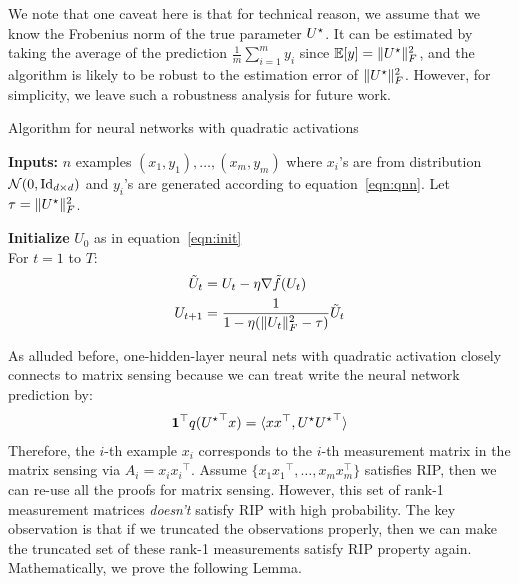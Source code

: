  We note that one caveat here is that for technical reason, we assume that we know the Frobenius norm of the true parameter ${{U}^\star}$.  It can be estimated by taking the average of the prediction $\frac{1}{m}\sum_{i  = 1}^m y_i$ since $\operatorname*{\mathbb E}[y]  = \|{{U}^\star}\|_{F}^2$, and the algorithm is likely to be robust to the estimation error of $\|{{U}^\star}\|_{F}^2$. However, for simplicity, we leave such a robustness analysis for future work. 
\begin{algorithm}\caption{Algorithm for neural networks with quadratic activations}\label{alg:aqnn}
{\bf Inputs: } $n$ examples $(x_1, y_1),\dots, (x_m, y_m)$ where $x_i$'s are from distribution $\mathcal{N}(0, \operatorname{Id}_{d\times d})$ and $y_i$'s are generated according to equation~\eqref{eqn:qnn}. Let $\tau = \|{{U}^\star}\|_{F}^2$. 

{\bf Initialize} $U_0$ as in equation~\eqref{eqn:init}	\\
For $t =1$ to $T$:
\begin{align}
\tilde{U}_t & = U_t - \eta \nabla \tilde{f}(U_t) \nonumber\\
U_{t + 1 } &= \frac{1}{1 - \eta (\| {U}_t\|_{F}^2- \tau)} \tilde{U}_t \nonumber
\end{align}
\end{algorithm}
  




As alluded before, one-hidden-layer neural nets with quadratic activation closely connects to matrix sensing because we can treat write the neural network prediction by: 
\begin{align*}
{\bf 1}^\top  q({{{U}^\star}}^\top x) = \langle xx^\top, {{U}^\star} {{U}^\star}^\top \rangle
\end{align*}
Therefore, the $i$-th example $x_i$ corresponds to  the $i$-th measurement  matrix in the matrix sensing via $A_i = x_i{x_i}^\top$.  Assume $\{ x_1{x_1}^\top, \dots,  x_mx_m^\top\}$ satisfies RIP, then we can re-use all the proofs for matrix sensing. However, this set of rank-1 measurement matrices \textit{doesn't} satisfy RIP with high probability. The key observation is that if we truncated the observations properly, then we can make the truncated set of these rank-1 measurements  satisfy RIP property again. Mathematically, we prove the following Lemma. 


